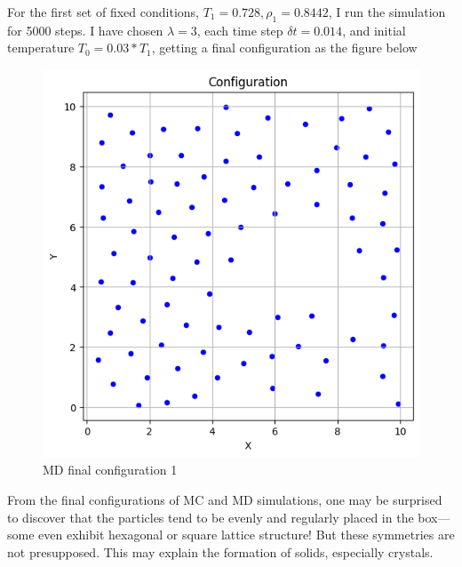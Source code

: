 \documentclass[letterpaper,12pt]{article}
\numberwithin{equation}{section}
\begin{document}
\begin{enumerate}[label=(\alph*)]
    \vspace{\baselineskip}
    For the first set of fixed conditions, $T_1=0.728,\rho_1=0.8442$, I run the simulation for 5000 steps. I have chosen $\lambda=3$, each time step $\delta t=0.014$, and initial temperature $T_0=0.03*T_1$, getting a final configuration as the figure below 
    \begin{figure}[H]
        \centering
        \includegraphics[width=.8\textwidth]{final_config_md1.png}
        \caption{MD final configuration 1} 
    \end{figure}
    From the final configurations of MC and MD simulations, one may be surprised to discover that the particles tend to be evenly and regularly placed in the box---some even exhibit hexagonal or square lattice structure! But these symmetries are not presupposed. This may explain the formation of solids, especially crystals. 


\end{enumerate}
\end{document}
